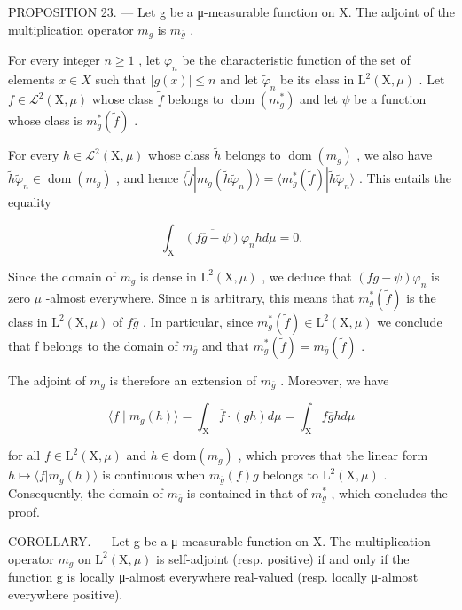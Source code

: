 PROPOSITION 23. --- Let g be a μ-measurable function on X. The adjoint of the multiplication operator \(m_{g}\) is \(m_{\overline{g}}\) .

For every integer \(n \geqslant 1\) , let \(\varphi_{n}\) be the characteristic function of the set of elements \(x \in X\) such that \(|g(x)| \leqslant n\) and let \(\widetilde{\varphi}_{n}\) be its class in \(\mathrm{L}^{2}(\mathrm{X}, \mu)\) . Let \(f \in \mathcal{L}^{2}(\mathrm{X}, \mu)\) whose class \(\widetilde{f}\) belongs to \(\operatorname{dom}(m_{g}^{*})\) and let \(\psi\) be a function whose class is \(m_{g}^{*}(\widetilde{f})\) .

For every \(h \in \mathcal{L}^2(\mathrm{X}, \mu)\) whose class \(\widetilde{h}\) belongs to \(\operatorname{dom}(m_g)\) , we also have \(\widetilde{h}\widetilde{\varphi}_n \in \operatorname{dom}(m_g)\) , and hence \(\langle \widetilde{f} | m_g(\widetilde{h}\widetilde{\varphi}_n) \rangle = \langle m_g^*(\widetilde{f}) | \widetilde{h}\widetilde{\varphi}_n \rangle\) . This entails the equality

\[
\int_ {\mathrm{X}} \overline {{(f \overline {{g}} - \psi)}} \varphi_ {n} h d \mu = 0.
\]

Since the domain of \(m_{g}\) is dense in \(\mathrm{L}^{2}(\mathrm{X},\mu)\) , we deduce that \((f\overline{g}-\psi)\varphi_{n}\) is zero \(\mu\) -almost everywhere. Since n is arbitrary, this means that \(m_{g}^{*}(\widetilde{f})\) is the class in \(\mathrm{L}^{2}(\mathrm{X},\mu)\) of \(f\overline{g}\) . In particular, since \(m_{g}^{*}(\widetilde{f}) \in \mathrm{L}^{2}(\mathrm{X},\mu)\) we conclude that f belongs to the domain of \(m_{\overline{g}}\) and that \(m_{g}^{*}(\widetilde{f}) = m_{\overline{g}}(\widetilde{f})\) .

The adjoint of \(m_{g}\) is therefore an extension of \(m_{\overline{g}}\) . Moreover, we have

\[
\langle f \mid m _ {g} (h) \rangle = \int_ {\mathrm{X}} \overline {{f}} \cdot (g h) d \mu = \int_ {\mathrm{X}} f \overline {{g}} h d \mu
\]

for all \(f \in \mathrm{L}^{2}(\mathrm{X}, \mu)\) and \(h \in \mathrm{dom}(m_{g})\) , which proves that the linear form \(h \mapsto \langle f | m_{g}(h) \rangle\) is continuous when \(m_{\overline{g}}(f) g\) belongs to \(\mathrm{L}^{2}(\mathrm{X}, \mu)\) . Consequently, the domain of \(m_{\overline{g}}\) is contained in that of \(m_{g}^{*}\) , which concludes the proof.

COROLLARY. --- Let g be a μ-measurable function on X. The multiplication operator \(m_{g}\) on \(\mathrm{L}^{2}(\mathrm{X},\mu)\) is self-adjoint (resp. positive) if and only if the function g is locally μ-almost everywhere real-valued (resp. locally μ-almost everywhere positive).

